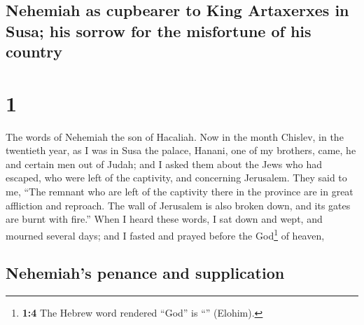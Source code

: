 \hypertarget{nehemiah-as-cupbearer-to-king-artaxerxes-in-susa-his-sorrow-for-the-misfortune-of-his-country}{%
\subsection{Nehemiah as cupbearer to King Artaxerxes in Susa; his sorrow
for the misfortune of his
country}\label{nehemiah-as-cupbearer-to-king-artaxerxes-in-susa-his-sorrow-for-the-misfortune-of-his-country}}

\hypertarget{section}{%
\section{1}\label{section}}

 The words of Nehemiah the son of Hacaliah. Now in the
month Chislev, in the twentieth year, as I was in Susa the palace,
 Hanani, one of my brothers, came, he and certain men out
of Judah; and I asked them about the Jews who had escaped, who were left
of the captivity, and concerning Jerusalem.  They said to
me, ``The remnant who are left of the captivity there in the province
are in great affliction and reproach. The wall of Jerusalem is also
broken down, and its gates are burnt with fire.''  When I
heard these words, I sat down and wept, and mourned several days; and I
fasted and prayed before the God\footnote{\textbf{1:4} The Hebrew word
  rendered ``God'' is ``'' (Elohim).} of heaven,

\hypertarget{nehemiahs-penance-and-supplication}{%
\subsection{Nehemiah's penance and
supplication}\label{nehemiahs-penance-and-supplication}}

